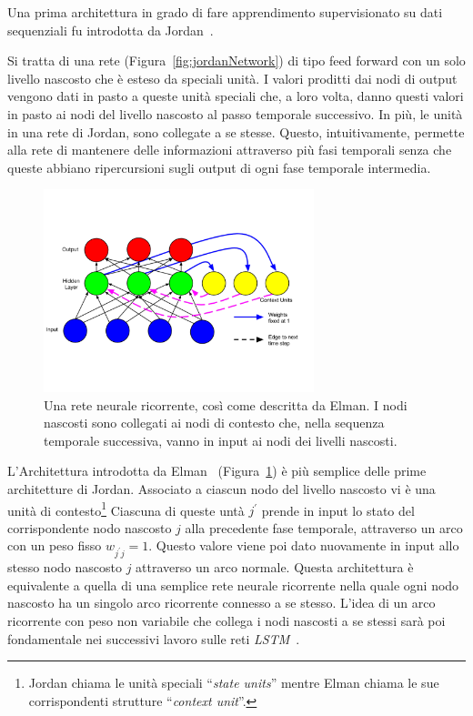 Una prima architettura in grado di fare apprendimento supervisionato su dati
sequenziali fu introdotta da Jordan~\cite{Jordan:1986}.

Si tratta di una rete (Figura~\ref{fig:jordanNetwork}) di tipo feed forward
con un solo livello nascosto che \`e esteso da speciali unit\`a. I valori proditti
dai nodi di output vengono dati in pasto a queste unit\`a speciali che, a loro
volta, danno questi valori in pasto ai nodi del livello nascosto al passo temporale
successivo. In pi\`u, le unit\`a in una rete di Jordan, sono collegate a se stesse.
Questo, intuitivamente, permette alla rete di mantenere delle informazioni attraverso
pi\`u fasi temporali senza che queste abbiano ripercursioni sugli output di ogni
fase temporale intermedia.

\begin{figure}[tp]
  \centering
  \begin{center}
    \includegraphics[width=0.7\textwidth]{./images/elmanNetwork.png}
  \end{center}
  \caption{Una rete neurale ricorrente, cos\`i come descritta da Elman.
  I nodi nascosti sono collegati ai nodi di contesto che, nella sequenza temporale
  successiva, vanno in input ai nodi dei livelli nascosti.}
  \label{fig:elmanNetwork}
\end{figure}

L'Architettura introdotta da Elman~\cite{Elman:1990} (Figura~\ref{fig:elmanNetwork}) \`e pi\`u semplice delle prime
architetture di Jordan. Associato a ciascun nodo del livello nascosto vi \`e una
unit\`a di contesto\footnote{Jordan chiama le unit\`a speciali ``\emph{state units}''
mentre Elman chiama le sue corrispondenti strutture ``\emph{context unit}''.}
Ciascuna di queste unt\`a $j^{'}$ prende in input lo stato del corrispondente
nodo nascosto $j$ alla precedente fase temporale, attraverso un arco con un peso
fisso $w_{j^{'}j} = 1$. Questo valore viene poi dato nuovamente in input allo
stesso nodo nascosto $j$ attraverso un arco normale. Questa architettura \`e
equivalente a quella di una semplice rete neurale ricorrente nella quale ogni
nodo nascosto ha un singolo arco ricorrente connesso a se stesso. L'idea di un
arco ricorrente con peso non variabile che collega i nodi nascosti a se stessi
sar\`a poi fondamentale nei successivi lavoro sulle reti \emph{LSTM}~\cite{Hochreiter:1997}.

